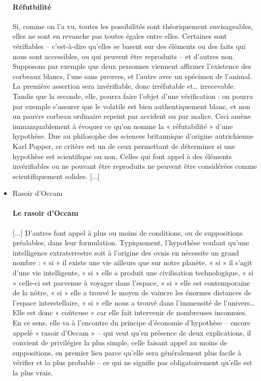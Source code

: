 \documentclass[a4paper,12pt]{article}
\begin{document}
\begin{itemize}
 \paragraph{Réfutbilité}
 Si, comme on l’a vu, toutes les possibilités sont théoriquement envisageables, elles ne sont en revanche pas toutes égales entre elles. Certaines sont vérifiables – c’est-à-dire qu’elles se basent sur des éléments ou des faits qui nous sont accessibles, ou qui peuvent être reproduits – et d’autres non. Supposons par exemple que deux personnes viennent affirmer l’existence des corbeaux blancs, l’une sans preuves, et l’autre avec un spécimen de l’animal. La première assertion sera invérifiable, donc irréfutable et… irrecevable. Tandis que la seconde, elle, pourra faire l’objet d’une vérification : on pourra par exemple s’assurer que le volatile est bien authentiquement blanc, et non un pauvre corbeau ordinaire repeint par accident ou par malice. Ceci amène immanquablement à évoquer ce qu’on nomme la « réfutabilité » d’une hypothèse. Due au philosophe des sciences britannique d’origine autrichienne Karl Popper, ce critère est un de ceux permettant de déterminer si une hypothèse est scientifique ou non. Celles qui font appel à des éléments invérifiables ou ne pouvant être reproduits ne peuvent être considérées comme scientifiquement solides. [...]
 
 \item Rasoir d'Occam
 \paragraph{Le rasoir d'Occam}
 [...] D’autres font appel à plus ou moins de conditions, ou de suppositions préalables, dans leur formulation. Typiquement, l’hypothèse voulant qu’une intelligence extraterrestre soit à l’origine des ovnis en nécessite un grand nombre : « si » il existe une vie ailleurs que sur notre planète, « si » il s’agit d’une vie intelligente, « si » elle a produit une civilisation technologique, « si » celle-ci est parvenue à voyager dans l’espace, « si » elle est contemporaine de la nôtre, « si » elle a trouvé le moyen de vaincre les énormes distances de l’espace interstellaire, « si » elle nous a trouvé dans l’immensité de l’univers… Elle est donc « coûteuse » car elle fait intervenir de nombreuses inconnues. En ce sens, elle va à l’encontre du principe d’économie d’hypothèse – encore appelé « rasoir d’Occam » – qui veut qu’en présence de deux explications, il convient de privilégier la plus simple, celle faisant appel au moins de suppositions, en premier lieu parce qu’elle sera généralement plus facile à vérifier et la plus probable – ce qui ne signifie pas obligatoirement qu’elle est la plus vraie.

\end{itemize}
\end{document}
